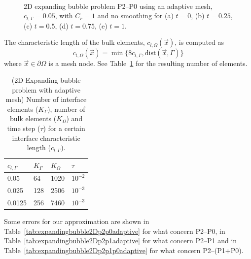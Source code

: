 \documentclass[a4paper,12pt,onecolumn]{article}
\begin{document}
\begin{figure}[htbp]
  \centering
  \\
  \quad
  \\
  \quad
  \\
  \caption{2D expanding bubble problem P2--P0 using an adaptive mesh, $c_{l,\Gamma}=0.05$, with $C_r=1$ and no smoothing for (a) $t=0$, (b) $t=0.25$, (c) $t=0.5$, (d) $t=0.75$, (e) $t=1$.}
  \label{fig:expanding_bubble_adaptive}
\end{figure}

The characteristic length of the bulk elements, $c_{l,\Omega}(\vec{x})$, is computed as
\begin{equation}\label{eq:adaptive_criteria}
 c_{l,\Omega}(\vec{x})=\min\big\{8c_{l,\Gamma},\textrm{dist}(\vec{x},\Gamma)\big\}
\end{equation}
where $\vec{x}\in\partial\Omega$ is a mesh node. See Table~\ref{tab:expandingbubble2Delements_adaptive} for the resulting number of elements. 
\begin{table}
 \center
\begin{tabular}{llll}
\hline
$c_{l,\Gamma}$ & $K_\Gamma$ & $K_\Omega$ & $\tau$ \\
\hline
0.05 & 64 & 1020 & $10^{-2}$ \\
0.025 & 128 & 2506 & $10^{-3}$\\
0.0125 & 256 & 7460 & $10^{-3}$\\
\hline
\end{tabular}
\caption{(2D Expanding bubble problem with adaptive mesh) Number of interface elements ($K_\Gamma$), number of bulk elements ($K_\Omega$) and time step ($\tau$) for a certain interface characteristic length ($c_{l,\Gamma}$).}
\label{tab:expandingbubble2Delements_adaptive}
\end{table}

Some errors for our approximation are shown in Table~\ref{tab:expandingbubble2Dp2p0adaptive} for what concern P2--P0, in Table~\ref{tab:expandingbubble2Dp2p1adaptive} for what concern P2--P1 and in Table~\ref{tab:expandingbubble2Dp2p1p0adaptive} for what concern P2--(P1+P0).
\end{document}
